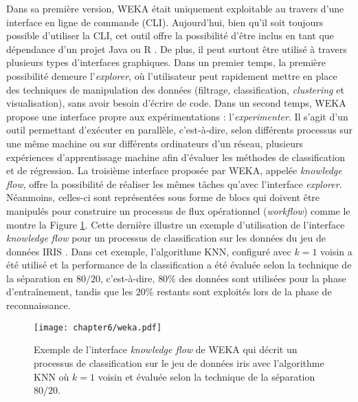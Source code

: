 Dans sa première version, \acs{WEKA} était uniquement exploitable au travers d'une interface en ligne de commande (\acs{CLI}). Aujourd'hui, bien qu'il soit toujours possible d'utiliser la \acs{CLI}, cet outil offre la possibilité d'être inclus en tant que dépendance d'un projet Java ou \textsf{R} \citep{Hornik2009}. De plus, il peut surtout être utilisé à travers plusieurs types d'interfaces graphiques. Dans un premier temps, la première possibilité demeure l'\emph{explorer}, où l'utilisateur peut rapidement mettre en place des techniques de manipulation des données (filtrage, classification, \textit{clustering} et visualisation), sans avoir besoin d'écrire de code. Dans un second temps, \acs{WEKA} propose une interface propre aux expérimentations : l'\emph{experimenter}. Il s'agit d'un outil permettant d'exécuter en parallèle, c'est-à-dire, selon différents processus sur une même machine ou sur différents ordinateurs d'un réseau, plusieurs expériences d'apprentissage machine afin d'évaluer les méthodes de classification et de régression. La troisième interface proposée par \acs{WEKA}, appelée \emph{knowledge flow}, offre la possibilité de réaliser les mêmes tâches qu'avec l'interface \emph{explorer}. Néanmoins, celles-ci sont représentées sous forme de blocs qui doivent être manipulés pour construire un processus de flux opérationnel (\textit{workflow}) comme le montre la Figure \ref{fig:weka}. Cette dernière illustre un exemple d'utilisation de l'interface \emph{knowledge flow} pour un processus de classification sur les données du jeu de données IRIS \citep{Asuncion2007}. Dans cet exemple, l'algorithme \acs{KNN}, configuré avec $k=1$ voisin a été utilisé et la performance de la classification a été évaluée selon la technique de la séparation en $80/20$, c'est-à-dire, $80\%$ des données sont utilisées pour la phase d'entraînement, tandis que les $20\%$ restants sont exploités lors de la phase de reconnaissance.

\begin{figure}[H]
	\centering
	\texttt{[image: chapter6/weka.pdf]}
        \caption{Exemple de l'interface \textit{knowledge flow} de \acs{WEKA} qui décrit un processus de classification sur le jeu de données iris avec l'algorithme \acs{KNN} où $k=1$ voisin et évaluée selon la technique de la séparation $80/20$.}
	\label{fig:weka}
\end{figure}

